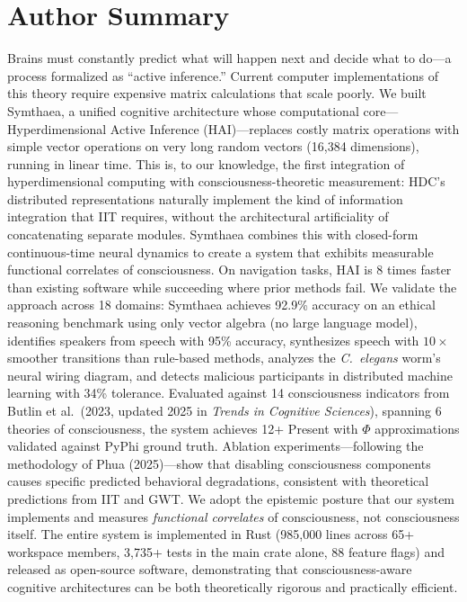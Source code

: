 \documentclass[10pt,letterpaper]{article}
\renewcommand{\Phi}{\varPhi}
\begin{document}
\section*{Author Summary}
Brains must constantly predict what will happen next and decide what to do---a process formalized as ``active inference.'' Current computer implementations of this theory require expensive matrix calculations that scale poorly. We built Symthaea, a unified cognitive architecture whose computational core---Hyperdimensional Active Inference (HAI)---replaces costly matrix operations with simple vector operations on very long random vectors (16,384 dimensions), running in linear time. This is, to our knowledge, the first integration of hyperdimensional computing with consciousness-theoretic measurement: HDC's distributed representations naturally implement the kind of information integration that IIT requires, without the architectural artificiality of concatenating separate modules. Symthaea combines this with closed-form continuous-time neural dynamics to create a system that exhibits measurable functional correlates of consciousness. On navigation tasks, HAI is 8 times faster than existing software while succeeding where prior methods fail. We validate the approach across 18 domains: Symthaea achieves 92.9\% accuracy on an ethical reasoning benchmark using only vector algebra (no large language model), identifies speakers from speech with 95\% accuracy, synthesizes speech with $10{\times}$ smoother transitions than rule-based methods, analyzes the \emph{C.~elegans} worm's neural wiring diagram, and detects malicious participants in distributed machine learning with 34\% tolerance. Evaluated against 14 consciousness indicators from Butlin et al.\ (2023, updated 2025 in \emph{Trends in Cognitive Sciences}), spanning 6 theories of consciousness, the system achieves 12+ Present with $\Phi$ approximations validated against PyPhi ground truth.
Ablation experiments---following the methodology of Phua (2025)---show that disabling consciousness components causes specific predicted behavioral degradations, consistent with theoretical predictions from IIT and GWT.
We adopt the epistemic posture that our system implements and measures \emph{functional correlates} of consciousness, not consciousness itself. The entire system is implemented in Rust (985,000 lines across 65+ workspace members, 3,735+ tests in the main crate alone, 88 feature flags) and released as open-source software, demonstrating that consciousness-aware cognitive architectures can be both theoretically rigorous and practically efficient.
\end{document}
